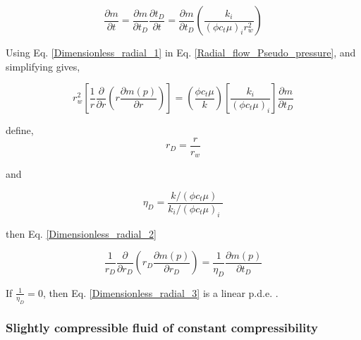 \documentclass{llncs}
\numberwithin{equation}{section}
\numberwithin{figure}{section}
\numberwithin{table}{section}
\begin{document}
    \begin{equation}
        \frac{\partial m}{\partial t}=\frac{\partial m}{\partial {{t}_{D}}}\frac{\partial {{t}_{D}}}{\partial t}=\frac{\partial m}{\partial {{t}_{D}}}\left( \frac{{{k}_{i}}}{{{\left( \phi {{c}_{t}}\mu  \right)}_{i}}r_{w}^{2}} \right)
        \label{Dimensionless_radial_1}
    \end{equation}

    Using Eq. \ref{Dimensionless_radial_1} in Eq. \ref{Radial_flow_Pseudo_pressure}, and simplifying gives,

    \begin{equation}
        r_{w}^{2}\left[ \frac{1}{r}\frac{\partial }{\partial r}\left( r\frac{\partial m\left( p \right)}{\partial r} \right) \right]=\left( \frac{\phi {{c}_{t}}\mu }{k} \right)\left[ \frac{{{k}_{i}}}{{{\left( \phi {{c}_{t}}\mu  \right)}_{i}}} \right]\frac{\partial m}{\partial {{t}_{D}}}
        \label{Dimensionless_radial_2}
    \end{equation}

     define,
    \begin{equation}
        {{r}_{D}}=\frac{r}{{{r}_{w}}}
        \label{Dimensionless_lenght}
    \end{equation}

    and 

    \begin{equation}
        {{\eta }_{D}}=\frac{{k}/{\left( \phi {{c}_{t}}\mu  \right)}\;}{{{{k}_{i}}}/{{{\left( \phi {{c}_{t}}\mu  \right)}_{i}}}\;}
        \label{Dimensionless_diffusivity}
    \end{equation}

    then Eq. \ref{Dimensionless_radial_2} 

    \begin{equation}
        \frac{1}{{{r}_{D}}}\frac{\partial }{\partial {{r}_{D}}}\left( {{r}_{D}}\frac{\partial m\left( p \right)}{\partial {{r}_{D}}} \right)=\frac{1}{{{\eta }_{D}}}\frac{\partial m\left( p \right)}{\partial {{t}_{D}}}
        \label{Dimensionless_radial_3}
    \end{equation}

    If $\frac{1}{{{\eta }_{D}}}=0$, then Eq. \ref{Dimensionless_radial_3} is a linear p.d.e. .

    \subsubsection{Slightly compressible fluid of constant compressibility}
\end{document}
